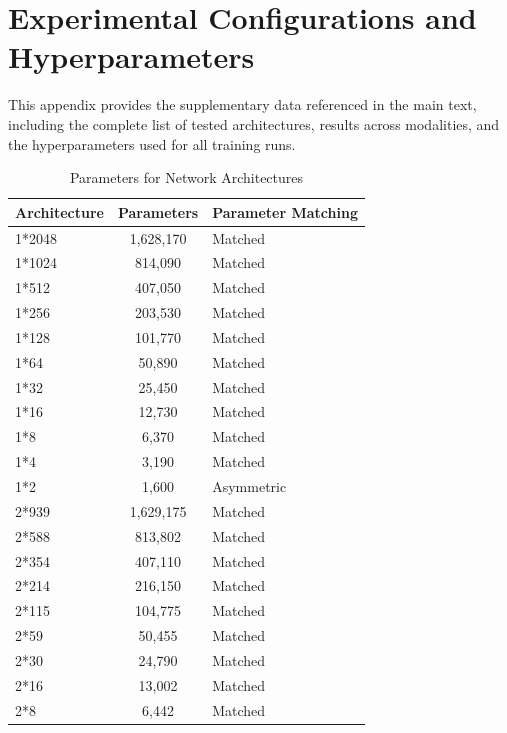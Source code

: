 \documentclass[conference]{IEEEtran}
\begin{document}
\clearpage

\FloatBarrier
\appendix
\section{Experimental Configurations and Hyperparameters}
\label{sec:appendix_a}

This appendix provides the supplementary data referenced in the main text, including the complete list of tested architectures, results across modalities, and the hyperparameters used for all training runs.

\begin{table}[ht]
\centering
\caption{Parameters for Network Architectures}
\label{tab:architecture_parameters}
\begin{tabular}{lcl}
\toprule
\textbf{Architecture} & \textbf{Parameters} & \textbf{Parameter Matching} \\
\midrule
1*2048     & 1,628,170       & Matched \\
1*1024     & 814,090         & Matched \\
1*512      & 407,050         & Matched \\
1*256      & 203,530         & Matched \\
1*128      & 101,770         & Matched \\
1*64       & 50,890          & Matched \\
1*32       & 25,450          & Matched \\
1*16       & 12,730          & Matched \\
1*8        & 6,370           & Matched \\
1*4        & 3,190           & Matched \\
1*2        & 1,600           & Asymmetric \\
2*939      & 1,629,175       & Matched \\
2*588      & 813,802         & Matched \\
2*354      & 407,110         & Matched \\
2*214      & 216,150         & Matched \\
2*115      & 104,775         & Matched \\
2*59       & 50,455          & Matched \\
2*30       & 24,790          & Matched \\
2*16       & 13,002          & Matched \\
2*8        & 6,442           & Matched \\

\end{tabular}
\end{table}
\end{document}
